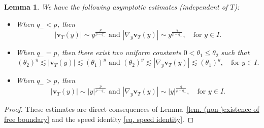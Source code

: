 \documentclass[11pt,twoside,reqno]{amsart}
\newtheorem{lemma}{Lemma}[section]
\numberwithin{equation}{section}
\begin{document}
\begin{lemma}\label{lem. v_T(y) asymptotic behavior}
    We have the following asymptotic estimates (independent of $T$):
\begin{itemize}
    \item[(1)] When $q_{-}<p$, then
    \begin{equation*}
        |\mathbf{v}_{T}(y)|\sim y^{\frac{p}{p-q_{-}}}\mbox{ and }|\nabla_{y}\mathbf{v}_{T}(y)|\sim y^{\frac{q}{p-q_{-}}},\quad\mbox{for }y\in I.
    \end{equation*}
    \item[(2)] When $q_{-}=p$, then there exist two uniform constants $0<\theta_{1}\leq \theta_{2}$ such that
    \begin{equation*}
        (\theta_{2})^{y}\lesssim|\mathbf{v}_{T}(y)|\lesssim(\theta_{1})^{y}\mbox{ and }(\theta_{2})^{y}\lesssim|\nabla_{y}\mathbf{v}_{T}(y)|\lesssim(\theta_{1})^{y},\quad\mbox{for }y\in I.
    \end{equation*}
    \item[(3)] When $q_{-}>p$, then
    \begin{equation*}
        |\mathbf{v}_{T}(y)|\sim|y|^{\frac{p}{p-q_{-}}}\mbox{ and }|\nabla_{y}\mathbf{v}_{T}(y)|\sim|y|^{\frac{q}{p-q_{-}}},\quad\mbox{for }y\in I.
    \end{equation*}
\end{itemize}
\end{lemma}
\begin{proof}
These estimates are direct consequences of Lemma~\ref{lem. (non-)existence of free boundary}
and the speed identity \eqref{eq. speed identity}.
\end{proof}
\end{document}

